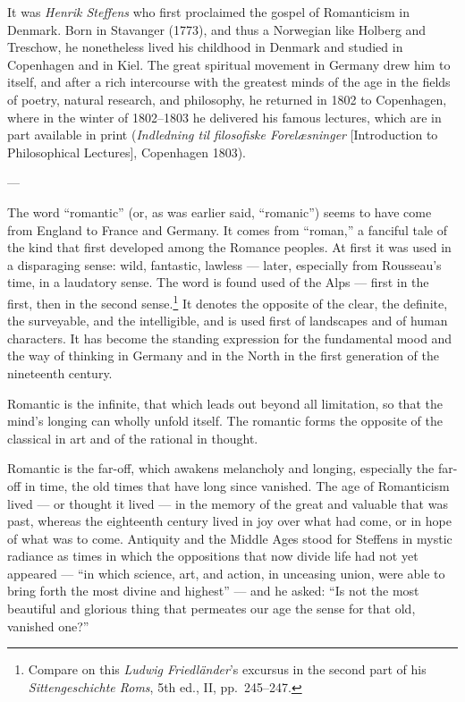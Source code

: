 \documentclass[12pt,a4paper]{book}
\newcommand{\opage}[1]{\marginnote{\footnotesize\textit{[#1]}}}
\begin{document}
It was \emph{Henrik Steffens} who first proclaimed the gospel of Romanticism in Denmark.
Born in Stavanger (1773), and thus a Norwegian like Holberg and Treschow, he
nonetheless lived his childhood in Denmark and studied in Copenhagen and in Kiel.
The great spiritual movement in Germany drew him to itself, and after a rich
intercourse with the greatest minds of the age in the fields of poetry, natural
research, and philosophy, he returned in 1802 to Copenhagen, where in the winter of
1802--1803 he delivered his famous lectures, which are in part available in print
(\emph{Indledning til filosofiske Forelæsninger} [Introduction to Philosophical
Lectures], Copenhagen 1803).

\begin{center}---\end{center}

The word ``romantic'' (or, as was earlier said, ``romanic'') seems to have come
from England to France and Germany. It comes from ``roman,'' a fanciful tale of the
kind that first developed among the Romance peoples. At first it was used in a
disparaging sense: wild, fantastic, lawless --- later, especially from Rousseau's
time, in a laudatory sense. The word is found used of the Alps --- first in the
first, then in the second sense.\footnote{Compare on this \emph{Ludwig Friedländer}'s
excursus in the second part of his \emph{Sittengeschichte Roms}, 5th ed., II,
pp.~245--247.} It denotes the opposite of the clear, the definite, the surveyable,
and the intelligible, and is used first of landscapes and of human characters. It
has become the standing expression for the fundamental mood and the way of thinking
in Germany and in the North in the first generation of the nineteenth century.

Romantic is the infinite, that which leads out beyond all limitation, so that the
mind's longing can wholly unfold itself. The \opage{43}romantic forms the opposite of the
classical in art and of the rational in thought.

Romantic is the far-off, which awakens melancholy and longing, especially the
far-off in time, the old times that have long since vanished. The age of
Romanticism lived --- or thought it lived --- in the memory of the great and
valuable that was past, whereas the eighteenth century lived in joy over what had
come, or in hope of what was to come. Antiquity and the Middle Ages stood for
Steffens in mystic radiance as times in which the oppositions that now divide life
had not yet appeared --- ``in which science, art, and action, in unceasing union,
were able to bring forth the most divine and highest'' --- and he asked: ``Is not
the most beautiful and glorious thing that permeates our age the sense for that old,
vanished one?''
\end{document}
